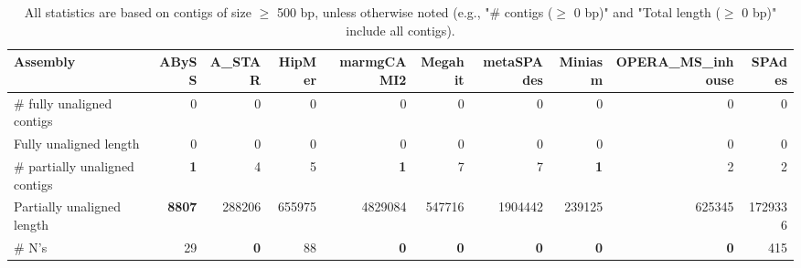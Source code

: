 \documentclass[12pt,a4paper]{article}
\begin{document}
\begin{table}[ht]
\begin{center}
\caption{All statistics are based on contigs of size $\geq$ 500 bp, unless otherwise noted (e.g., "\# contigs ($\geq$ 0 bp)" and "Total length ($\geq$ 0 bp)" include all contigs).}
\begin{tabular}{|l*{9}{|r}|}
\hline
Assembly & ABySS & A\_STAR & HipMer & marmgCAMI2 & Megahit & metaSPAdes & Miniasm & OPERA\_MS\_inhouse & SPAdes \\ \hline
\# fully unaligned contigs & 0 & 0 & 0 & 0 & 0 & 0 & 0 & 0 & 0 \\ \hline
Fully unaligned length & 0 & 0 & 0 & 0 & 0 & 0 & 0 & 0 & 0 \\ \hline
\# partially unaligned contigs & {\bf 1} & 4 & 5 & {\bf 1} & 7 & 7 & {\bf 1} & 2 & 2 \\ \hline
Partially unaligned length & {\bf 8807} & 288206 & 655975 & 4829084 & 547716 & 1904442 & 239125 & 625345 & 1729336 \\ \hline
\# N's & 29 & {\bf 0} & 88 & {\bf 0} & {\bf 0} & {\bf 0} & {\bf 0} & {\bf 0} & 415 \\ \hline
\end{tabular}
\end{center}
\end{table}
\end{document}
